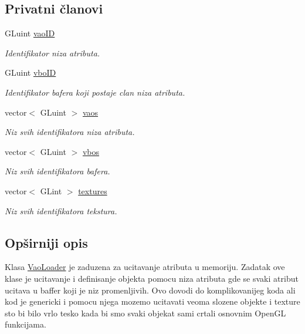 \subsection*{Privatni članovi}
\begin{DoxyCompactItemize}
\item 
G\+Luint \hyperlink{classcore_1_1VaoLoader_a09fec3fcaf674c66046a859e60c9c674}{vao\+ID}
\begin{DoxyCompactList}\small\item\em Identifikator niza atributa. \end{DoxyCompactList}\item 
G\+Luint \hyperlink{classcore_1_1VaoLoader_a4bc8031f15ad1b7c7eff491f926b93e4}{vbo\+ID}
\begin{DoxyCompactList}\small\item\em Identifikator bafera koji postaje clan niza atributa. \end{DoxyCompactList}\item 
vector$<$ G\+Luint $>$ \hyperlink{classcore_1_1VaoLoader_ad37e6f10d175e35a6fce4b9f76b559e2}{vaos}
\begin{DoxyCompactList}\small\item\em Niz svih identifikatora niza atributa. \end{DoxyCompactList}\item 
vector$<$ G\+Luint $>$ \hyperlink{classcore_1_1VaoLoader_a8866245dbda8794e13956115557159a2}{vbos}
\begin{DoxyCompactList}\small\item\em Niz svih identifikatora bafera. \end{DoxyCompactList}\item 
vector$<$ G\+Lint $>$ \hyperlink{classcore_1_1VaoLoader_a6f2a03c0bca3b9c8211215014747cbaa}{textures}
\begin{DoxyCompactList}\small\item\em Niz svih identifikatora tekstura. \end{DoxyCompactList}\end{DoxyCompactItemize}


\subsection{Opširniji opis}
Klasa \hyperlink{classcore_1_1VaoLoader}{Vao\+Loader} je zaduzena za ucitavanje atributa u memoriju. Zadatak ove klase je ucitavanje i definisanje objekta pomocu niza atributa gde se svaki atribut ucitava u baffer koji je niz promenljivih. Ovo dovodi do komplikovanijeg koda ali kod je genericki i pomocu njega mozemo ucitavati veoma slozene objekte i texture sto bi bilo vrlo tesko kada bi smo svaki objekat sami crtali osnovnim Open\+GL funkcijama. 

